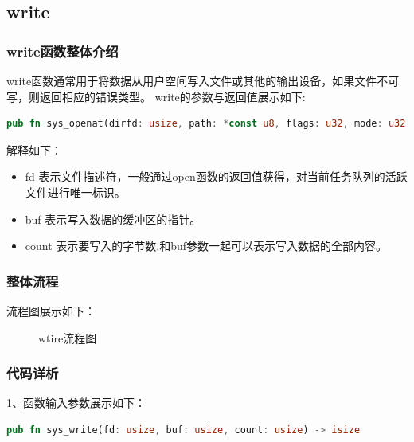 \subsection{write}
\subsubsection{write函数整体介绍}
write函数通常用于将数据从用户空间写入文件或其他的输出设备，如果文件不可写，则返回相应的错误类型。
\noindent
write的参数与返回值展示如下:
\begin{lstlisting}[language={Rust}, 
    caption={write的参数与返回值}]
pub fn sys_openat(dirfd: usize, path: *const u8, flags: u32, mode: u32) -> isize
\end{lstlisting}
解释如下：
\begin{itemize}
    \item fd 表示文件描述符，一般通过open函数的返回值获得，对当前任务队列的活跃文件进行唯一标识。
    \item buf 表示写入数据的缓冲区的指针。
    \item count 表示要写入的字节数,和buf参数一起可以表示写入数据的全部内容。
\end{itemize}
\subsubsection{整体流程}
流程图展示如下：
\begin{figure}[H]
    \centering
    \caption{wtire流程图}
\end{figure}

\subsubsection{代码详析}
1、函数输入参数展示如下：
\begin{lstlisting}[language={Rust},
    caption={write的参数与返回值}]
    pub fn sys_write(fd: usize, buf: usize, count: usize) -> isize
\end{lstlisting}

